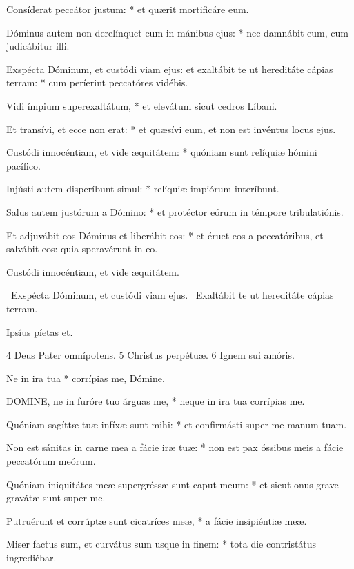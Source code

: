Consíderat peccátor justum: * et quærit mortificáre eum.

Dóminus autem non derelínquet eum in mánibus ejus: * nec damnábit eum, cum judicábitur illi.

Exspécta Dóminum, et custódi viam ejus: et exaltábit te ut hereditáte cápias terram: * cum períerint peccatóres vidébis.

Vidi ímpium superexaltátum, * et elevátum sicut cedros Líbani.

Et transívi, et ecce non erat: * et quæsívi eum, et non est invéntus locus ejus.

Custódi innocéntiam, et vide æquitátem: * quóniam sunt relíquiæ hómini pacífico.

Injústi autem disperíbunt simul: * relíquiæ impiórum interíbunt.

Salus autem justórum a Dómino: * et protéctor eórum in témpore tribulatiónis.

Et adjuvábit eos Dóminus et liberábit eos: * et éruet eos a peccatóribus, et salvábit eos: quia speravérunt in eo.

 Custódi innocéntiam, et vide æquitátem.


\V\ Exspécta Dóminum, et custódi viam ejus. \R\ Exaltábit te ut hereditáte cápias terram.

 Ipsíus píetas et.

 4 Deus Pater omnípotens. 5 Christus perpétuæ. 6 Ignem sui amóris.


 Ne in ira tua * corrípias me, Dómine.


\lettrine[lines=2]{D}{OMINE}, ne in furóre tuo árguas me, * neque in ira tua corrípias me.

Quóniam sagíttæ tuæ infíxæ sunt mihi: * et confirmásti super me manum tuam.

Non est sánitas in carne mea a fácie iræ tuæ: * non est pax óssibus meis a fácie peccatórum meórum.

Quóniam iniquitátes meæ supergréssæ sunt caput meum: * et sicut onus grave gravátæ sunt super me.

Putruérunt et corrúptæ sunt cicatríces meæ, * a fácie insipiéntiæ meæ.

Miser factus sum, et curvátus sum usque in finem: * tota die contristátus ingrediébar.


